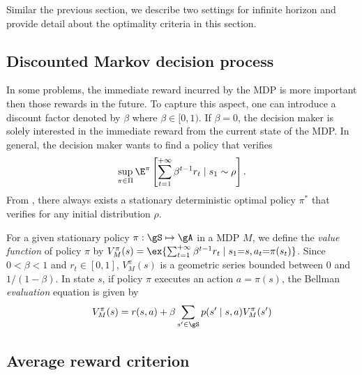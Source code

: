 Similar the previous section, we describe two settings for infinite horizon and provide detail about the optimality criteria in this section.

\subsection{Discounted Markov decision process}

In some problems, the immediate reward incurred by the MDP is more important then those rewards in the future.
To capture this aspect, one can introduce a discount factor denoted by $\beta$ where $\beta\in[0,1)$.
If $\beta=0$, the decision maker is solely interested in the immediate reward from the current state of the MDP.
In general, the decision maker wants to find a policy that verifies
\begin{equation}
    \label{eq:discount_obj}
    \sup_{\pi\in\Pi}\E^\pi\left[\sum_{t=1}^{+\infty} \beta^{t-1}r_t \mid s_1\sim \rho\right].
\end{equation}
From \cite[Chapter~6]{puterman2014markov}, there always exists a stationary deterministic optimal policy $\pi^*$ that verifies  for any initial distribution $\rho$.

For a given stationary policy $\pi:\gS\mapsto\gA$ in a MDP $M$, we define the \emph{value function} of policy $\pi$ by $V_M^\pi(s)=\ex{\sum_{t=1}^{+\infty}\beta^{t-1}r_t \mid s_1{=}s,a_t{=}\pi(s_t)}$.
Since $0<\beta<1$ and $r_t\in[0,1]$, $V_M^\pi(s)$ is a geometric series bounded between $0$ and $1/(1-\beta)$.
In state $s$, if policy $\pi$ executes an action $a=\pi(s)$, the Bellman \emph{evaluation} equation is given by
\begin{equation}
    \label{eq:discount_be_eval}
    V_M^\pi(s)= r(s, a) +\beta\sum_{s'\in\gS}p(s'\mid s,a)V_M^\pi(s')
\end{equation}


\subsection{Average reward criterion}



